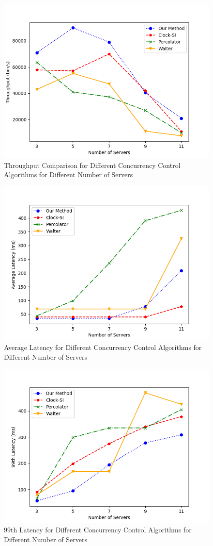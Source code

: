\begin{figure}[H]
    \centering
    \includegraphics[width=0.8\linewidth]{figure/37.png}
    \caption{Throughput Comparison for Different Concurrency Control Algorithms for Different Number of Servers}
    \label{fig:37}
\end{figure}
\begin{figure}[H]
    \centering
    \includegraphics[width=0.8\linewidth]{figure/38.png}
    \caption{Average Latency for Different Concurrency Control Algorithms for Different Number of Servers}
    \label{fig:38}
\end{figure}
\begin{figure}[H]
    \centering
    \includegraphics[width=0.8\linewidth]{figure/39.png}
    \caption{99th Latency for Different Concurrency Control Algorithms for Different Number of Servers}
    \label{fig:39}
\end{figure}



